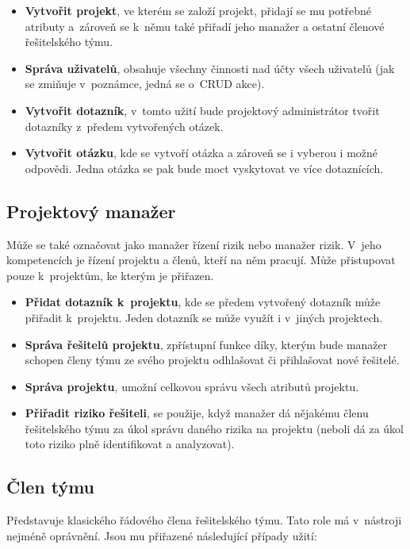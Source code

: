 \begin{itemize}
    \item \textbf{Vytvořit projekt}, ve kterém se založí projekt, přidají se mu potřebné atributy a~zároveň se k~němu také přiřadí jeho manažer a ostatní členové řešitelského týmu.
    \item \textbf{Správa uživatelů}, obsahuje všechny činnosti nad účty všech uživatelů (jak se zmiňuje v~poznámce, jedná se o~CRUD akce).
    \item \textbf{Vytvořit dotazník}, v~tomto užití bude projektový administrátor tvořit dotazníky z~předem vytvořených otázek. 
    \item \textbf{Vytvořit otázku}, kde se vytvoří otázka a zároveň se i vyberou i možné odpovědi. Jedna otázka se pak bude moct vyskytovat ve více dotaznících. 
\end{itemize}

\subsection*{Projektový manažer}

Může se také označovat jako manažer řízení rizik nebo manažer rizik. V~jeho kompetencích je řízení projektu a členů, kteří na něm pracují. Může přistupovat pouze k~projektům, ke kterým je přiřazen.

\begin{itemize}
    \item \textbf{Přidat dotazník k~projektu}, kde se předem vytvořený dotazník může přiřadit k~projektu. Jeden dotazník se může využít i v~jiných projektech.  
    \item \textbf{Správa řešitelů projektu}, zpřístupní funkce díky, kterým bude manažer schopen členy týmu ze svého projektu odhlašovat či přihlašovat nové řešitelé.
    \item \textbf{Správa projektu}, umožní celkovou správu všech atributů projektu.
    \item \textbf{Přiřadit riziko řešiteli}, se použije, když manažer dá nějakému členu řešitelského týmu za úkol správu daného rizika na projektu (neboli dá za úkol toto riziko plně identifikovat a analyzovat).
\end{itemize}

\subsection*{Člen týmu}

Představuje klasického řádového člena řešitelského týmu. Tato role má v~nástroji nejméně oprávnění. Jsou mu přiřazené následující případy užití: 


